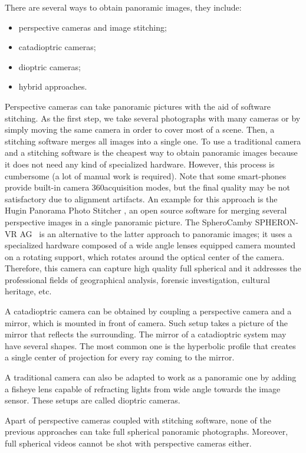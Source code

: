 There are several ways to obtain panoramic images, they include:
\begin{itemize}
	\item perspective cameras and image stitching;
	\item catadioptric cameras;
	\item dioptric cameras;
	\item hybrid approaches.
\end{itemize}

Perspective cameras can take panoramic pictures with the aid of software stitching. As the first step, we take several photographs with many cameras or by simply moving the same camera in order to cover most of a scene. Then, a stitching software merges all images into a single one. To use a traditional camera and a stitching software is the cheapest way to obtain panoramic images because it does not need any kind of specialized hardware. However, this process is cumbersome (a lot of manual work is required). Note that some smart-phones provide built-in camera 360\degree acquisition modes, but the final quality may be not satisfactory due to alignment artifacts.
An example for this approach is the Hugin Panorama Photo Stitcher 
\cite{hugin_photostitcher}, an open source software for merging several 
perspective images in a single panoramic picture.
The SpheroCam\texttrademark by SPHERON-VR AG\texttrademark~\cite{spheronvr}
is an alternative to 
the latter approach to panoramic images; it uses a specialized hardware composed
of a wide angle lenses equipped camera mounted on a rotating support, which rotates around the optical center of the camera. Therefore, this camera can capture high quality full spherical and it addresses the professional fields of geographical analysis, forensic investigation, cultural heritage, etc.

A catadioptric camera can be obtained by coupling a perspective camera and a mirror, which is mounted in front of camera. Such setup takes a picture of the mirror that reflects the surrounding. The mirror of a catadioptric system may have several shapes. The most common one is the hyperbolic profile that creates a single center of projection for every ray coming to the mirror.

A traditional camera can also be adapted to work as a panoramic one by adding a fisheye lens capable of refracting lights from wide angle towards the image sensor. These setups are called dioptric cameras.

Apart of perspective cameras coupled with stitching software, none of the previous approaches can take full spherical panoramic photographs. Moreover, full spherical videos cannot be shot with perspective cameras either.

